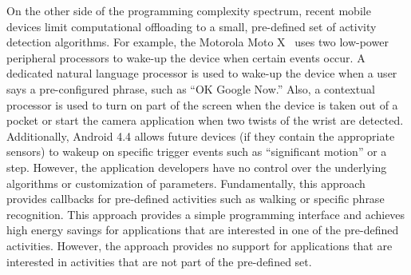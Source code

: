 On the other side of the programming complexity spectrum, recent
mobile devices limit computational offloading to a small, pre-defined
set of activity detection algorithms. For example, the Motorola Moto
X~\cite{motox} uses two low-power peripheral processors to wake-up the
device when certain events occur. A dedicated natural language
processor is used to wake-up the device when a user says a
pre-configured phrase, such as ``OK Google Now.''  Also, a contextual
processor is used to turn on part of the screen when the device is
taken out of a pocket or start the camera application when two twists
of the wrist are detected.  Additionally, Android 4.4 allows future
devices (if they contain the appropriate sensors) to wakeup on
specific trigger events such as ``significant motion'' or a step.
However, the application developers have no control over the
underlying algorithms or customization of parameters.  Fundamentally,
this approach provides callbacks for pre-defined activities such as
walking or specific phrase recognition.  This approach provides a
simple programming interface and achieves high energy savings for
applications that are interested in one of the pre-defined activities.
However, the approach provides no support for applications that are
interested in activities that are not part of the pre-defined set.

